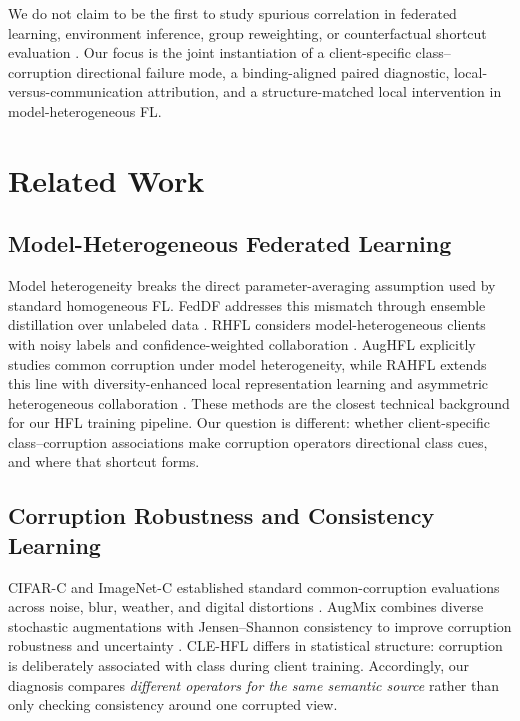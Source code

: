 \documentclass[10pt,twocolumn]{article}
\begin{document}
We do not claim to be the first to study spurious correlation in federated learning, environment inference, group reweighting, or counterfactual shortcut evaluation \citep{wang2024pflspurious,tang2024fedpin,ma2024fedcd,creager2021eiil,sagawa2020groupdro,vigneshwaran2026counterfactual}. Our focus is the joint instantiation of a client-specific class--corruption directional failure mode, a binding-aligned paired diagnostic, local-versus-communication attribution, and a structure-matched local intervention in model-heterogeneous FL.

\section{Related Work}

\subsection{Model-Heterogeneous Federated Learning}

Model heterogeneity breaks the direct parameter-averaging assumption used by standard homogeneous FL. FedDF addresses this mismatch through ensemble distillation over unlabeled data \citep{lin2020feddf}. RHFL considers model-heterogeneous clients with noisy labels and confidence-weighted collaboration \citep{fang2022rhfl}. AugHFL explicitly studies common corruption under model heterogeneity, while RAHFL extends this line with diversity-enhanced local representation learning and asymmetric heterogeneous collaboration \citep{fang2023aughfl,fang2025rahfl}. These methods are the closest technical background for our HFL training pipeline. Our question is different: whether client-specific class--corruption associations make corruption operators directional class cues, and where that shortcut forms.

\subsection{Corruption Robustness and Consistency Learning}

CIFAR-C and ImageNet-C established standard common-corruption evaluations across noise, blur, weather, and digital distortions \citep{hendrycks2019corruptions}. AugMix combines diverse stochastic augmentations with Jensen--Shannon consistency to improve corruption robustness and uncertainty \citep{cubuk2020augmix}. CLE-HFL differs in statistical structure: corruption is deliberately associated with class during client training. Accordingly, our diagnosis compares \emph{different operators for the same semantic source} rather than only checking consistency around one corrupted view.
\end{document}
